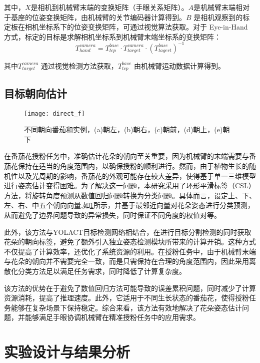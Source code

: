 其中，$X$是相机到机械臂末端的变换矩阵（手眼关系矩阵）。$A$是机械臂末端相对于基座的位姿变换矩阵，由机械臂的关节编码器计算得到。$B$ 是相机观察到的标定板在相机坐标系下的位姿变换矩阵，可通过视觉算法获取。对于 Eye-in-Hand 方式，标定的目标是求解相机坐标系到机械臂末端坐标系的变换矩阵：
\begin{equation}
	\label{equ:hand-in-eye2}
	T_{hand}^{camera} = T_{tcp}^{base}\cdot T_{target}^{camera} \cdot(T_{tagert}^{base})^{-1}
\end{equation}

其中$T_{target}^{camera} $ 通过视觉检测方法获取，$T_{tcp}^{base}$ 由机械臂运动数据计算得到。



\subsection{目标朝向估计}
 \begin{figure}[htb]
	\texttt{[image: direct\_f]}
	\caption[不同朝向番茄和实例]{不同朝向番茄和实例，(a)朝左，(b)朝右，(c)朝前，(d)朝上，(e)朝下} %
	\label{fig:direction_f}
\end{figure}
在番茄花授粉任务中，准确估计花朵的朝向至关重要，因为机械臂的末端需要与番茄花保持在适当的角度范围内，以确保授粉的顺利进行。然而，由于植物生长的随机性以及光周期的影响，番茄花的外观可能存在较大差异，使得基于单一三维模型进行姿态估计变得困难。为了解决这一问题，本研究采用了环形平滑标签\cite{yang2023delivery}（CSL）方法，将旋转角度预测从数值回归问题转换为分类问题。具体而言，设定上、下、左、右、中五个朝向向量,如\cref{fig:direction_f}所示，并基于最邻近向量对花朵姿态进行分类预测，从而避免了边界问题导致的异常损失，同时保证不同角度的权值对等。

此外，该方法与YOLACT目标检测网络相结合，在进行目标分割检测的同时获取花朵的朝向标签，避免了额外引入独立姿态检测模块所带来的计算开销。这种方式不仅提高了计算效率，还优化了系统资源的利用。在授粉任务中，由于机械臂末端与花朵的朝向并不需要完全一致，而是只需保持在合理的角度范围内，因此采用离散化分类方法足以满足任务需求，同时降低了计算复杂度。

该方法的优势在于避免了数值回归方法可能导致的误差累积问题，同时减少了计算资源消耗，提高了推理速度。此外，它适用于不同生长状态的番茄花，使得授粉任务能够在复杂场景下保持稳定。综合来看，该方法有效地解决了花朵姿态估计问题，并能够满足手眼协调机械臂在精准授粉任务中的应用需求。

\section{实验设计与结果分析}

